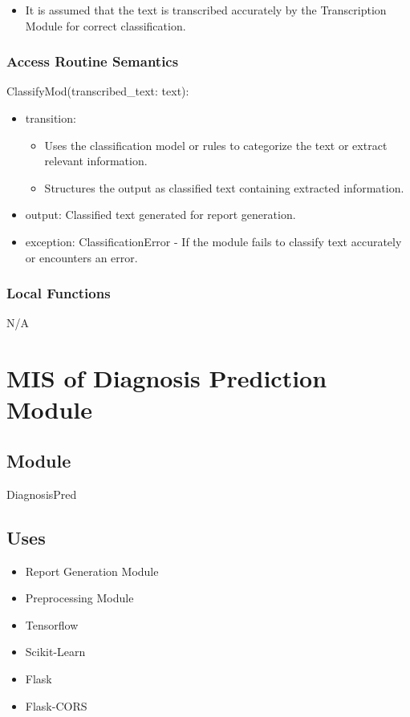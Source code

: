 \documentclass[12pt, titlepage]{article}
\begin{document}
\begin{itemize}
  \item It is assumed that the text is transcribed accurately by the Transcription Module for correct classification.
\end{itemize}

\subsubsection{Access Routine Semantics}

\noindent ClassifyMod(transcribed\_text: text):
\begin{itemize}
\item transition:
\begin{itemize}
  \item Uses the classification model or rules to categorize the text or extract relevant information.
  \item Structures the output as classified text containing extracted information.
\end{itemize} 
\item output: Classified text generated for report generation. 
\item exception: ClassificationError - If the module fails to classify text accurately or encounters an error. 
\end{itemize}

\subsubsection{Local Functions}

N/A

\newpage

\section{MIS of Diagnosis Prediction Module} \label{diag_pred_mod}

\subsection{Module}

DiagnosisPred

\subsection{Uses}
\begin{itemize}
  \item Report Generation Module
  \item Preprocessing Module
  \item Tensorflow
  \item Scikit-Learn
  \item Flask
  \item Flask-CORS
\end{itemize}
\end{document}
